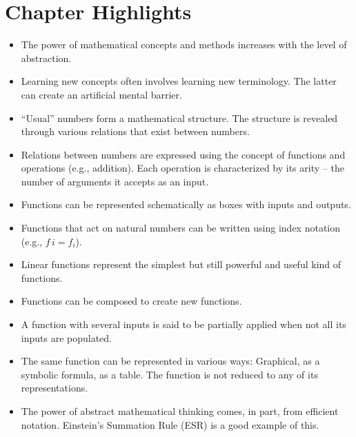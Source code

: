 \section*{Chapter Highlights}
{\chhc
  \it
  \small
\begin{itemize}
\item The power of mathematical concepts and methods increases with
  the level of abstraction.
\item Learning new concepts often involves learning new
  terminology. The latter can create an artificial mental barrier.
\item ``Usual'' numbers form a mathematical structure. The structure
  is revealed through various relations that exist between numbers.
\item Relations between numbers are expressed using the concept of
  functions and operations (e.g., addition). Each operation is
  characterized by its arity -- the number of arguments it accepts as
  an input.
\item Functions can be represented schematically as boxes with inputs
  and outputs.
\item Functions that act on natural numbers can be written using index
  notation (e.g., $f\, i = f_i$).
\item Linear functions represent the simplest but still powerful and
  useful kind of functions.
\item Functions can be composed to create new functions.
\item A function with several inputs is said to be partially applied when not
  all its inputs are populated.
\item The same function can be represented in various ways: Graphical,
  as a symbolic formula, as a table. The function is not reduced to
  any of its representations.
\item The power of abstract mathematical thinking comes, in part, from
  efficient notation. Einstein's Summation Rule (ESR) is a good
  example of this.
\end{itemize}


}
